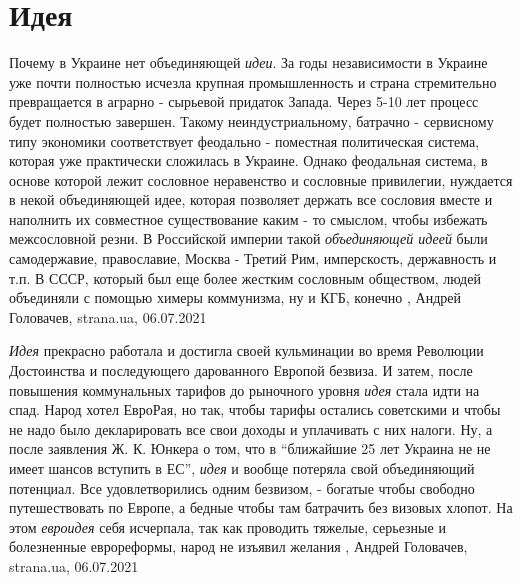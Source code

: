  
 
 
 
 
\chapter{Идея}
\label{sec:slova.idea}

Почему в Украине нет объединяющей \emph{идеи}.  За годы независимости в Украине
уже почти полностью исчезла крупная промышленность и страна стремительно
превращается в аграрно - сырьевой придаток Запада. Через 5-10 лет процесс будет
полностью завершен. Такому неиндустриальному, батрачно - сервисному типу
экономики соответствует феодально - поместная политическая система, которая уже
практически сложилась в Украине.  Однако феодальная система, в основе которой
лежит сословное неравенство и сословные привилегии, нуждается в некой
объединяющей идее, которая позволяет держать все сословия вместе и наполнить их
совместное существование каким - то смыслом, чтобы избежать межсословной резни.
В Российской империи такой \emph{объединяющей идеей} были самодержавие,
православие, Москва - Третий Рим, имперскость, державность и т.п.  В СССР,
который был еще более жестким сословным обществом, людей объединяли с помощью
химеры коммунизма, ну и КГБ, конечно
, 
Андрей Головачев, strana.ua, 06.07.2021

\emph{Идея} прекрасно работала и достигла своей кульминации во время Революции
Достоинства и последующего дарованного Европой безвиза. И затем, после
повышения коммунальных тарифов до рыночного уровня \emph{идея} стала идти на спад.
Народ хотел ЕвроРая, но так, чтобы тарифы остались советскими и чтобы не надо
было декларировать все свои доходы и уплачивать с них налоги. Ну, а после
заявления Ж. К. Юнкера о том, что в \enquote{ближайшие 25 лет Украина не не имеет
шансов вступить в ЕС}, \emph{идея} и вообще потеряла свой объединяющий потенциал. Все
удовлетворились одним безвизом, - богатые чтобы свободно путешествовать по
Европе, а бедные чтобы там батрачить без визовых хлопот. На этом \emph{евроидея} себя
исчерпала, так как проводить тяжелые, серьезные и болезненные еврореформы,
народ не изъявил желания
, 
Андрей Головачев, strana.ua, 06.07.2021

